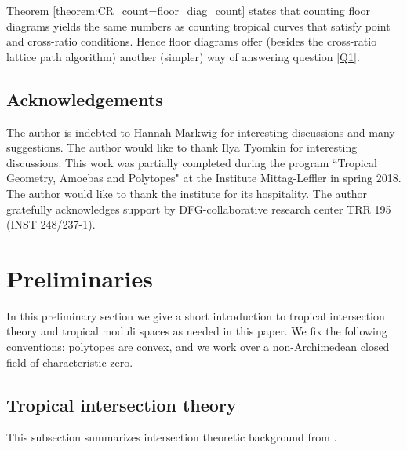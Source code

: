 \documentclass[11pt,reqno,a4]{amsart}
\theoremstyle{dotless}
\theoremstyle{definition}
\newcommand{\changelocaltocdepth}[1]{%
  \addtocontents{toc}{\protect\setcounter{tocdepth}{#1}}%
  \setcounter{tocdepth}{#1}%
}
\begin{document}
Theorem \ref{theorem:CR_count=floor_diag_count} states that counting floor diagrams yields the same numbers as counting tropical curves that satisfy point and cross-ratio conditions. Hence floor diagrams offer (besides the cross-ratio lattice path algorithm) another (simpler) way of answering question \ref{Q1}.



\subsection*{Acknowledgements}
The author is indebted to Hannah Markwig for interesting discussions and many suggestions.
The author would like to thank Ilya Tyomkin for interesting discussions.
This work was partially completed during the program ``Tropical Geometry, Amoebas and Polytopes" at the Institute
Mittag-Leffler in spring 2018. The author would like to thank the institute for its hospitality.
The author gratefully acknowledges support by DFG-collaborative research center TRR 195 (INST 248/237-1).



\changelocaltocdepth{2}
\section{Preliminaries}\label{section:preliminaries}

In this preliminary section we give a short introduction to tropical intersection theory and tropical moduli spaces as needed in this paper.
We fix the following conventions: polytopes are convex, and we work over a non-Archimedean closed field of characteristic zero.


\subsection*{Tropical intersection theory}
This subsection summarizes intersection theoretic background from  \cite{Allermann, FirstStepsIntersectionTheory, AllermannHampeRau}. 
\end{document}
